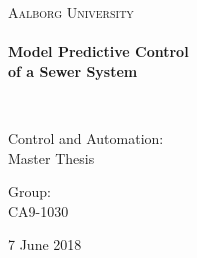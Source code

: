 %

\thispagestyle{empty}

\begin{center}

\vspace*{\fill}

\textsc{\LARGE Aalborg University}\\[1.0cm]

\HRule \\[0.4cm]
{ \HUGE \bfseries Model Predictive Control \\ of a Sewer System%
\\[0.5cm] } %

\HRule \\[1.5cm]%


\begin{minipage}{0.4\textwidth}
\begin{flushleft} \large
Control and Automation:\\
Master Thesis
\end{flushleft}
\end{minipage}
\begin{minipage}{0.4\textwidth}
\begin{flushright} \large
Group: \\
CA9-1030
\end{flushright}
\end{minipage}

\vspace*{\fill}


{\large 7 June 2018}

\end{center}
